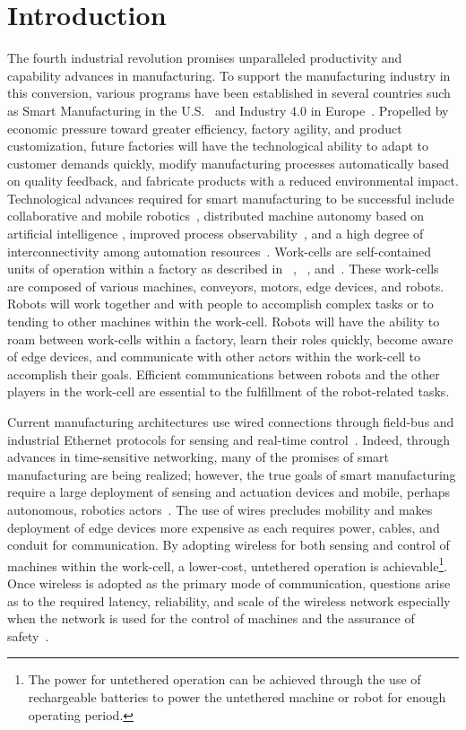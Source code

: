 \section{Introduction} \label{sysml:sec:intro}    
The fourth industrial revolution promises unparalleled productivity and capability advances in manufacturing. To support the manufacturing industry in this conversion, various programs have been established in several countries such as Smart Manufacturing in the U.S.~\cite{SmartManuf} and Industry 4.0 in Europe~\cite{Industry40, cpsInd4.0}. Propelled by economic pressure toward greater efficiency, factory agility, and product customization, future factories will have the technological ability to adapt to customer demands quickly, modify manufacturing processes automatically based on quality feedback, and fabricate products with a reduced environmental impact.  Technological advances required for smart manufacturing to be successful include collaborative and mobile robotics~\cite{indRobot2017}, distributed machine autonomy based on artificial intelligence \cite{ManufAI2009}, improved process observability~\cite{IIoToverview2018}, and a high degree of interconnectivity among automation resources~\cite{ieMag2018}. Work-cells are self-contained units of operation within a factory as described in ~\cite{Chen2001.rapid}, ~\cite{Marvel2017}, and~\cite{Ferreira2011}.  These work-cells are composed of various machines, conveyors, motors, edge devices, and robots.  Robots will work together and with people to accomplish complex tasks or to tending to other machines within the work-cell.  Robots will have the ability to roam between work-cells within a factory, learn their roles quickly, become aware of edge devices, and communicate with other actors within the work-cell to accomplish their goals. Efficient communications between robots and the other players in the work-cell are essential to the fulfillment of the robot-related tasks.



Current manufacturing architectures use wired connections through field-bus and industrial Ethernet protocols for sensing and real-time control~\cite{etherCAT, indPrinter}.  Indeed, through advances in time-sensitive networking, many of the promises of smart manufacturing are being realized; however, the true goals of smart manufacturing require a large deployment of sensing and actuation devices and mobile, perhaps autonomous, robotics actors~\cite{ieMag2018}.  The use of wires precludes mobility and makes deployment of edge devices more expensive as each  requires power, cables, and conduit for communication. By adopting wireless for both sensing and control of machines within the work-cell, a lower-cost, untethered operation is achievable\footnote{The power for untethered operation can be achieved through the use of rechargeable batteries to power the untethered machine or robot for enough operating period.}. Once wireless is adopted as the primary mode of communication, questions arise as to the required latency, reliability, and scale of the wireless network especially when the network is used for the control of machines and the assurance of safety~\cite{ieMag2018}. 

